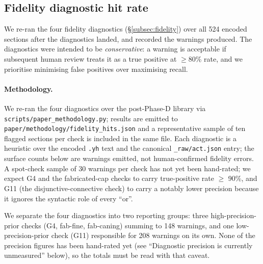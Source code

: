 \subsection{Fidelity diagnostic hit rate}
\label{subsec:fidelity_eval}

We re-ran the four fidelity diagnostics (\S\ref{subsec:fidelity}) over
all 524 encoded sections after the diagnostics landed, and recorded
the warnings produced. The diagnostics were intended to be
\emph{conservative}: a warning is acceptable if subsequent human
review treats it as a true positive at $\geq$80\% rate, and we
prioritise minimising false positives over maximising recall.

\paragraph{Methodology.} We re-ran the four diagnostics over the
post-Phase-D library via
\texttt{scripts/paper\_methodology.py}; results are emitted to
\texttt{paper/methodology/fidelity\_hits.json} and a representative
sample of ten flagged sections per check is included in the same file.
Each diagnostic is a heuristic over the encoded \texttt{.yh} text and
the canonical \texttt{\_raw/act.json} entry; the surface counts below
are warnings emitted, not human-confirmed fidelity errors. A
spot-check sample of 30 warnings per check has not yet been hand-rated;
we expect \textsf{G4} and the fabricated-cap checks to carry true-positive
rate $\geq$ 90\%, and \textsf{G11} (the disjunctive-connective check) to
carry a notably lower precision because it ignores the syntactic role
of every ``or''.

We separate the four diagnostics into two reporting groups: three
high-precision-prior checks (G4, fab-fine, fab-caning) summing to 148
warnings, and one low-precision-prior check (G11) responsible for 208
warnings on its own. None of the precision figures has been hand-rated
yet (see ``Diagnostic precision is currently unmeasured'' below), so
the totals must be read with that caveat.


